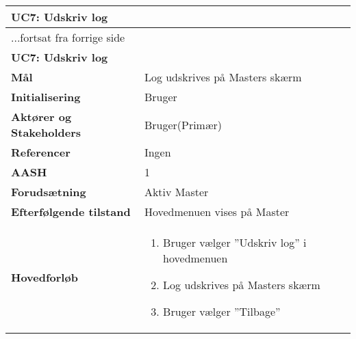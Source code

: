 \begin{center} \centering \label{UC7}
	\begin{longtable}{|p{5cm}|p{9cm}|}  %
	\hline
		\multicolumn{2}{|l|}{\textbf{UC7: Udskriv log}} \\\hline %
		\endfirsthead
		
		\multicolumn{2}{l}{...fortsat fra forrige side} \\ \hline %
		\multicolumn{2}{|l|}{\textbf{UC7: Udskriv log}} \\\hline %
		\endhead	
		
		\textbf{Mål}								&Log udskrives på Masters skærm	\\\hline
		\textbf{Initialisering}					&Bruger 					\\\hline
		\textbf{Aktører og Stakeholders}			&Bruger(Primær)			\\\hline
		\textbf{Referencer}						&Ingen					\\\hline
		\textbf{AASH}							&1						\\\hline
		\textbf{Forudsætning}					&Aktiv Master		\\\hline
		\textbf{Efterfølgende tilstand}			&Hovedmenuen vises på Master	\\\hline
		\textbf{Hovedforløb}					
			&\begin{enumerate}
	
				\item Bruger vælger ''Udskriv log'' i hovedmenuen 
				
				\item Log udskrives på Masters skærm
				
				\item Bruger vælger ''Tilbage''
	
			\end{enumerate}\\\hline
	\end{longtable} 
\end{center}

